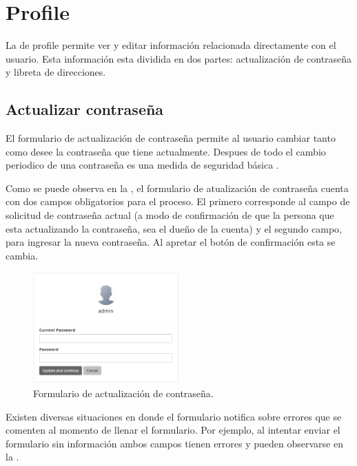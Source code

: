 \section{Profile}

	La \uiSiglaAS de profile permite ver y editar información relacionada directamente con el usuario. Esta información esta dividida en dos partes: actualización de contraseña y libreta de direcciones.

	\subsection{Actualizar contraseña}

		El formulario de actualización de contraseña permite al usuario cambiar tanto como desee la contraseña que tiene actualmente. Despues de todo el cambio periodico de una contraseña es una medida de seguridad básica \cite{zviran1999password}.

		Como se puede observa en la , el formulario de atualización de contraseña cuenta con dos campos obligatorios para el proceso. El primero corresponde al campo de solicitud de contraseña actual (a modo de confirmación de que la persona que esta actualizando la contraseña, sea el dueño de la cuenta) y el segundo campo, para ingresar la nueva contraseña. Al apretar el botón de confirmación esta se cambia.

		\begin{figure}[h!]
			\centering
			\includegraphics[width=0.5\textwidth]{figuras/profile/form_update_password.png}

			\caption{Formulario de actualización de contraseña.}
			\label{figure:profile:form:form_update_password}
		\end{figure}

		Existen diversas situaciones en donde el formulario notifica sobre errores que se comenten  al momento de llenar el formulario. Por ejemplo, al intentar enviar el formulario sin información ambos campos tienen errores y pueden observarse en la .



